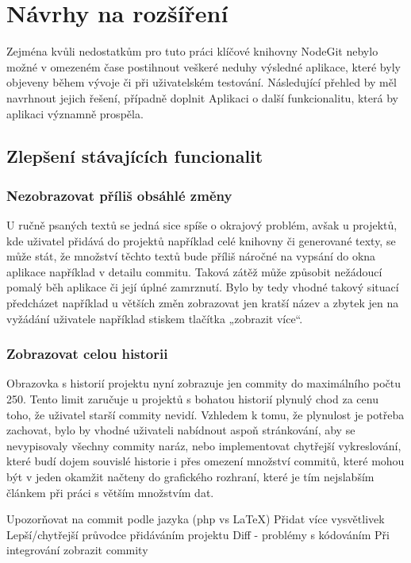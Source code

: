 \chapter{Návrhy na rozšíření}

Zejména kvůli nedostatkům pro tuto práci klíčové knihovny NodeGit nebylo možné v omezeném čase postihnout veškeré neduhy výsledné aplikace, které byly objeveny během vývoje či při uživatelském testování. Následující přehled by měl navrhnout jejich řešení, případně doplnit Aplikaci o další funkcionalitu, která by aplikaci významně prospěla.


\section{Zlepšení stávajících funcionalit}

\subsection{Nezobrazovat příliš obsáhlé změny}

U ručně psaných textů se jedná sice spíše o okrajový problém, avšak u projektů, kde uživatel přidává do projektů například celé knihovny či generované texty, se může stát, že množství těchto textů bude příliš náročné na vypsání do okna aplikace například v detailu commitu. Taková zátěž může způsobit nežádoucí pomalý běh aplikace či její úplné zamrznutí. Bylo by tedy vhodné takový situací předcházet například u větších změn zobrazovat jen kratší název a zbytek jen na vyžádání uživatele například stiskem tlačítka „zobrazit více“.

\subsection{Zobrazovat celou historii}

Obrazovka s historií projektu nyní zobrazuje jen commity do maximálního počtu 250. Tento limit zaručuje u projektů s bohatou historií plynulý chod za cenu toho, že uživatel starší commity nevidí. Vzhledem k tomu, že plynulost je potřeba zachovat, bylo by vhodné uživateli nabídnout aspoň stránkování, aby se nevypisovaly všechny commity naráz, nebo implementovat chytřejší vykreslování, které budí dojem souvislé historie i přes omezení množství commitů, které mohou být v jeden okamžit načteny do grafického rozhraní, které je tím nejslabším článkem při práci s větším množstvím dat.


Upozorňovat na commit  podle jazyka (php vs LaTeX)
Přidat více vysvětlivek
Lepší/chytřejší průvodce přidáváním projektu
Diff - problémy s kódováním
Při integrování zobrazit commity


